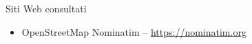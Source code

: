 \cleardoublepage
{}
{}
\nocite{*}


%

\vspace{2.5cm}
\begin{Large}Siti Web consultati\end{Large}
\begin{itemize}
    \item OpenStreetMap Nominatim -- \url{https://nominatim.org}
\end{itemize}

